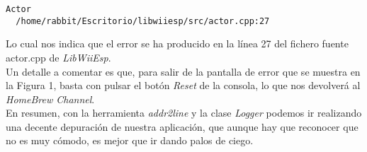 \begin{lstlisting}[style=consola]
  Actor
  /home/rabbit/Escritorio/libwiiesp/src/actor.cpp:27
\end{lstlisting}

Lo cual nos indica que el error se ha producido en la línea 27 del fichero fuente actor.cpp de \emph{LibWiiEsp}.\\

Un detalle a comentar es que, para salir de la pantalla de error que se muestra en la Figura 1, basta con pulsar el botón \emph{Reset} de la consola, lo que nos devolverá al \emph{HomeBrew Channel}. \\

En resumen, con la herramienta \emph{addr2line} y la clase \emph{Logger} podemos ir realizando una decente depuración de nuestra aplicación, que aunque hay que reconocer que no es muy cómodo, es mejor que ir dando palos de ciego.

\clearpage

